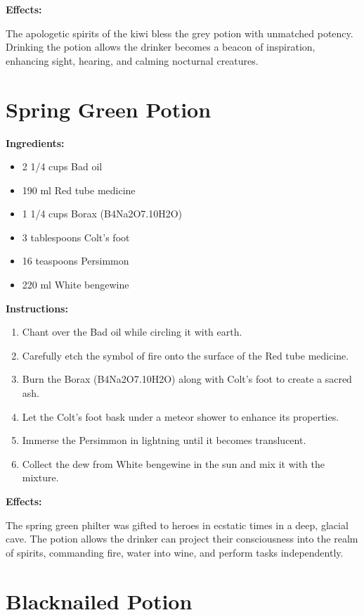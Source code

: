 \documentclass{article}
\begin{document}
\textbf{Effects:}

The apologetic spirits of the kiwi bless the grey potion with unmatched potency. Drinking the potion allows the drinker becomes a beacon of inspiration, enhancing sight, hearing, and calming nocturnal creatures.

\newpage
\section*{Spring Green Potion}

\textbf{Ingredients:}

\begin{itemize}
  \item 2 1/4 cups Bad oil
  \item 190 ml Red tube medicine
  \item 1 1/4 cups Borax (B4Na2O7.10H2O)
  \item 3 tablespoons Colt's foot
  \item 16 teaspoons Persimmon
  \item 220 ml White bengewine
\end{itemize}

\textbf{Instructions:}

\begin{enumerate}
  \item Chant over the Bad oil while circling it with earth.
  \item Carefully etch the symbol of fire onto the surface of the Red tube medicine.
  \item Burn the Borax (B4Na2O7.10H2O) along with Colt's foot to create a sacred ash.
  \item Let the Colt's foot bask under a meteor shower to enhance its properties.
  \item Immerse the Persimmon in lightning until it becomes translucent.
  \item Collect the dew from White bengewine in the sun and mix it with the mixture.
\end{enumerate}

\textbf{Effects:}

The spring green philter was gifted to heroes in ecstatic times in a deep, glacial cave. The potion allows the drinker can project their consciousness into the realm of spirits, commanding fire, water into wine, and perform tasks independently.

\newpage
\section*{Blacknailed Potion}
\end{document}
